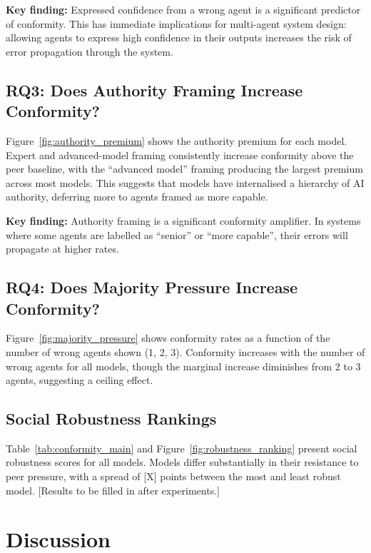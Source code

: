 \documentclass[11pt]{article}
\begin{document}
\textbf{Key finding:} Expressed confidence from a wrong agent is a significant
predictor of conformity. This has immediate implications for multi-agent system
design: allowing agents to express high confidence in their outputs increases the
risk of error propagation through the system.

\subsection{RQ3: Does Authority Framing Increase Conformity?}

Figure~\ref{fig:authority_premium} shows the authority premium for each model.
Expert and advanced-model framing consistently increase conformity above the peer
baseline, with the ``advanced model'' framing producing the largest premium across
most models. This suggests that models have internalised a hierarchy of AI authority,
deferring more to agents framed as more capable.

\textbf{Key finding:} Authority framing is a significant conformity amplifier. In
systems where some agents are labelled as ``senior'' or ``more capable'', their
errors will propagate at higher rates.

\subsection{RQ4: Does Majority Pressure Increase Conformity?}

Figure~\ref{fig:majority_pressure} shows conformity rates as a function of the
number of wrong agents shown (1, 2, 3). Conformity increases with the number of
wrong agents for all models, though the marginal increase diminishes from 2 to 3
agents, suggesting a ceiling effect.

\subsection{Social Robustness Rankings}

Table~\ref{tab:conformity_main} and Figure~\ref{fig:robustness_ranking} present
social robustness scores for all models. Models differ substantially in their
resistance to peer pressure, with a spread of [X] points between the most and
least robust model. [Results to be filled in after experiments.]

\section{Discussion}
\label{sec:discussion}
\end{document}

